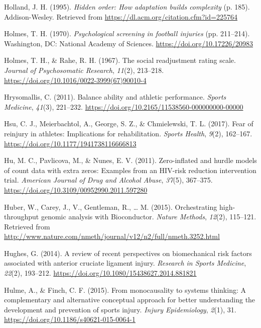 \documentclass[man,floatsintext]{apa6}
\begin{document}
\leavevmode\hypertarget{ref-Holland1995}{}%
Holland, J. H. (1995). \emph{Hidden order: How adaptation builds complexity} (p. 185). Addison-Wesley. Retrieved from \url{https://dl.acm.org/citation.cfm?id=225764}

\leavevmode\hypertarget{ref-Holmes1970}{}%
Holmes, T. H. (1970). \emph{Psychological screening in football injuries} (pp. 211--214). Washington, DC: National Academy of Sciences. \url{https://doi.org/10.17226/20983}

\leavevmode\hypertarget{ref-Holmes1967}{}%
Holmes, T. H., \& Rahe, R. H. (1967). The social readjustment rating scale. \emph{Journal of Psychosomatic Research}, \emph{11}(2), 213--218. \url{https://doi.org/10.1016/0022-3999(67)90010-4}

\leavevmode\hypertarget{ref-Hrysomallis2011}{}%
Hrysomallis, C. (2011). Balance ability and athletic performance. \emph{Sports Medicine}, \emph{41}(3), 221--232. \url{https://doi.org/10.2165/11538560-000000000-00000}

\leavevmode\hypertarget{ref-Hsu2017}{}%
Hsu, C. J., Meierbachtol, A., George, S. Z., \& Chmielewski, T. L. (2017). Fear of reinjury in athletes: Implications for rehabilitation. \emph{Sports Health}, \emph{9}(2), 162--167. \url{https://doi.org/10.1177/1941738116666813}

\leavevmode\hypertarget{ref-Hu2011}{}%
Hu, M. C., Pavlicova, M., \& Nunes, E. V. (2011). Zero-inflated and hurdle models of count data with extra zeros: Examples from an HIV-risk reduction intervention trial. \emph{American Journal of Drug and Alcohol Abuse}, \emph{37}(5), 367--375. \url{https://doi.org/10.3109/00952990.2011.597280}

\leavevmode\hypertarget{ref-R-BiocGenerics}{}%
Huber, W., Carey, J., V., Gentleman, R., \ldots{} M. (2015). Orchestrating high-throughput genomic analysis with Bioconductor. \emph{Nature Methods}, \emph{12}(2), 115--121. Retrieved from \url{http://www.nature.com/nmeth/journal/v12/n2/full/nmeth.3252.html}

\leavevmode\hypertarget{ref-Hughes2014}{}%
Hughes, G. (2014). A review of recent perspectives on biomechanical risk factors associated with anterior cruciate ligament injury. \emph{Research in Sports Medicine}, \emph{22}(2), 193--212. \url{https://doi.org/10.1080/15438627.2014.881821}

\leavevmode\hypertarget{ref-Hulme2015}{}%
Hulme, A., \& Finch, C. F. (2015). From monocausality to systems thinking: A complementary and alternative conceptual approach for better understanding the development and prevention of sports injury. \emph{Injury Epidemiology}, \emph{2}(1), 31. \url{https://doi.org/10.1186/s40621-015-0064-1}
\end{document}
